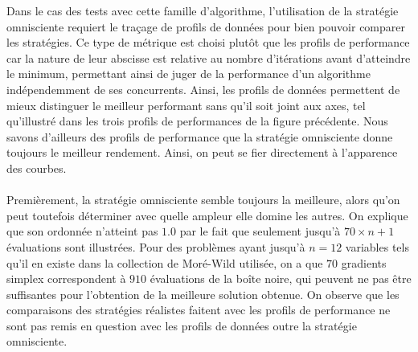 	Dans le cas des tests avec cette famille d'algorithme, l'utilisation de la stratégie omnisciente requiert le traçage de profils de données pour bien pouvoir comparer les stratégies.  Ce type de métrique est choisi plutôt que les profils de performance car la nature de leur abscisse est relative au nombre d'itérations avant d'atteindre le minimum, permettant ainsi de juger de la performance d'un algorithme indépendemment de ses concurrents. Ainsi, les profils de données permettent de mieux distinguer le meilleur performant sans qu'il soit joint aux axes, tel qu'illustré dans les trois profils de performances de la figure précédente. Nous savons d'ailleurs des profils de performance que la stratégie omnisciente donne toujours le meilleur rendement. Ainsi, on peut se fier directement à l'apparence des courbes.\\\\ 
	Premièrement, la stratégie omnisciente semble toujours la meilleure, alors qu'on peut toutefois déterminer avec quelle ampleur elle domine les autres. On explique que son ordonnée n'atteint pas $1.0$ par le fait que seulement jusqu'à $70 \times n+1$ évaluations sont illustrées. Pour des problèmes ayant jusqu'à $n=12$ variables tels qu'il en existe dans la collection de Moré-Wild utilisée, on a que $70$ gradients simplex correspondent à $910$ évaluations de la boîte noire, qui peuvent ne pas être suffisantes pour l'obtention de la meilleure solution obtenue. On observe que les comparaisons des stratégies réalistes faitent avec les profils de performance ne sont pas remis en question avec les profils de données outre la stratégie omnisciente.
